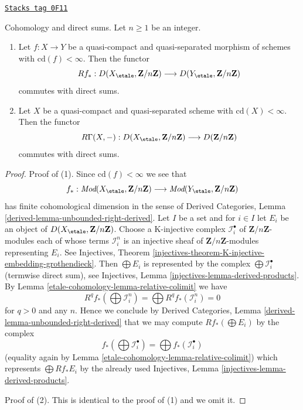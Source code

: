 \begin{lemma}
\label{etale-cohomology-lemma-finite-cd-mod-n-direct-sums}
\href{https://stacks.math.columbia.edu/tag/0F11}{\texttt{Stacks tag 0F11}}

Cohomology and direct sums. Let $n \geq 1$ be an integer.
\begin{enumerate}
\item Let $f : X \to Y$ be a quasi-compact and quasi-separated morphism
of schemes with $\text{cd}(f) < \infty$. Then the functor
$$
Rf_* :
D(X_\etale, \mathbf{Z}/n\mathbf{Z})
\longrightarrow
D(Y_\etale, \mathbf{Z}/n\mathbf{Z})
$$
commutes with direct sums.
\item Let $X$ be a quasi-compact and quasi-separated scheme with
$\text{cd}(X) < \infty$. Then the functor
$$
R\Gamma(X, -) :
D(X_\etale, \mathbf{Z}/n\mathbf{Z})
\longrightarrow
D(\mathbf{Z}/n\mathbf{Z})
$$
commutes with direct sums.
\end{enumerate}
\end{lemma}

\begin{proof}
Proof of (1). Since $\text{cd}(f) < \infty$ we see that
$$
f_* :
\textit{Mod}(X_\etale, \mathbf{Z}/n\mathbf{Z})
\longrightarrow
\textit{Mod}(Y_\etale, \mathbf{Z}/n\mathbf{Z})
$$
has finite cohomological dimension in the sense of
Derived Categories, Lemma \ref{derived-lemma-unbounded-right-derived}.
Let $I$ be a set and for $i \in I$ let $E_i$ be
an object of $D(X_\etale, \mathbf{Z}/n\mathbf{Z})$.
Choose a K-injective complex $\mathcal{I}_i^\bullet$
of $\mathbf{Z}/n\mathbf{Z}$-modules each of whose
terms $\mathcal{I}_i^n$ is an injective sheaf of
$\mathbf{Z}/n\mathbf{Z}$-modules representing $E_i$.
See Injectives, Theorem
\ref{injectives-theorem-K-injective-embedding-grothendieck}.
Then $\bigoplus E_i$ is represented by the complex
$\bigoplus \mathcal{I}_i^\bullet$ (termwise direct sum), see
Injectives, Lemma \ref{injectives-lemma-derived-products}.
By Lemma \ref{etale-cohomology-lemma-relative-colimit} we have
$$
R^qf_*(\bigoplus \mathcal{I}_i^n) =
\bigoplus R^qf_*(\mathcal{I}_i^n) = 0
$$
for $q > 0$ and any $n$. Hence we conclude by
Derived Categories, Lemma \ref{derived-lemma-unbounded-right-derived}
that we may compute $Rf_*(\bigoplus E_i)$ by the complex
$$
f_*(\bigoplus \mathcal{I}_i^\bullet) =
\bigoplus f_*(\mathcal{I}_i^\bullet)
$$
(equality again by Lemma \ref{etale-cohomology-lemma-relative-colimit}) which
represents $\bigoplus Rf_*E_i$ by the already used
Injectives, Lemma \ref{injectives-lemma-derived-products}.

\medskip\noindent
Proof of (2). This is identical to the proof of (1)
and we omit it.
\end{proof}

